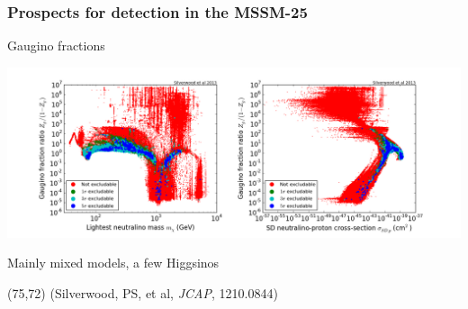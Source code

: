 \documentclass[xcolor=dvipsnames]{beamer}
\begin{document}
\begin{frame}
\frametitle{Prospects for detection in the MSSM-25}
Gaugino fractions
\vspace{3mm}

\includegraphics[width=1.1\textwidth, trim = 50 0 0 0, clip=true]{MSSM25_Gaugino}

\vspace{3mm}
Mainly mixed models, a few Higgsinos

\begin{textblock}{80}(75,72)
  {\tiny(Silverwood, PS, et al, \textit{JCAP}, 1210.0844)}
\end{textblock}

\end{frame}
\end{document}
